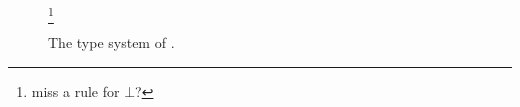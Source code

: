 
\begin{figure*}


  \footnote{miss a rule for $\bot$?}


  \caption{The type system of \name.}
  \label{fig:fi-type}
\end{figure*}





